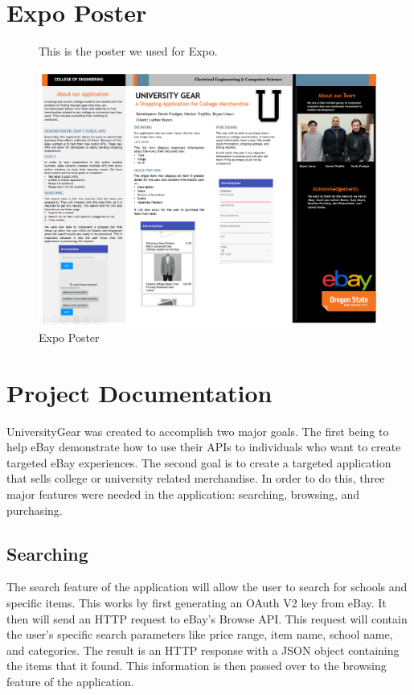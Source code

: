 \documentclass[journal,compsoc, 10pt, draftclsnofoot, onecolumn]{IEEEtran}
\begin{document}
\section{Expo Poster}
\begin{figure}[!h]
This is the poster we used for Expo.
\centering
\caption{Expo Poster}
\includegraphics[angle=90,scale=.67]{expoPoster}
\end{figure}
\FloatBarrier

\section{Project Documentation}
UniversityGear was created to accomplish two major goals. The first being to help eBay
demonstrate how to use their APIs to individuals who want to create targeted eBay experiences.
The second goal is to create a targeted application that sells college or university related
merchandise. In order to do this, three major features were needed in the application:
searching, browsing, and purchasing.

\subsection{Searching}
The search feature of the application will allow the user to search for schools and specific
items. This works by first generating an OAuth V2 key from eBay. It then will send an HTTP
request to eBay's Browse API. This request will contain the user's specific search parameters
like price range, item name, school name, and categories. The result is an HTTP response with a
JSON object containing the items that it found. This information is then passed over to the
browsing feature of the application.
\end{document}
